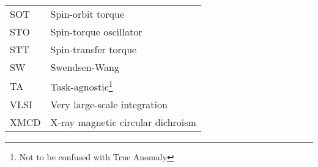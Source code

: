 {\begin{longtable}[l]{ll}
        SOT   & Spin-orbit torque                           \\
        STO   & Spin-torque oscillator                      \\
        STT   & Spin-transfer torque                        \\
        SW    & Swendsen-Wang                               \\ %
        TA    & Task-agnostic\footnote{Not to be confused with True Anomaly} \\
        VLSI  & Very large-scale integration                \\
        XMCD  & X-ray magnetic circular dichroism           \\
    \end{longtable}
}
